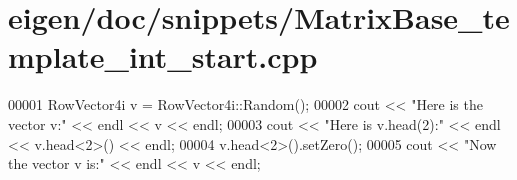 \hypertarget{eigen_2doc_2snippets_2_matrix_base__template__int__start_8cpp_source}{}\section{eigen/doc/snippets/\+Matrix\+Base\+\_\+template\+\_\+int\+\_\+start.cpp}
\label{eigen_2doc_2snippets_2_matrix_base__template__int__start_8cpp_source}

\begin{DoxyCode}
00001 RowVector4i v = RowVector4i::Random();
00002 cout << \textcolor{stringliteral}{"Here is the vector v:"} << endl << v << endl;
00003 cout << \textcolor{stringliteral}{"Here is v.head(2):"} << endl << v.head<2>() << endl;
00004 v.head<2>().setZero();
00005 cout << \textcolor{stringliteral}{"Now the vector v is:"} << endl << v << endl;
\end{DoxyCode}

